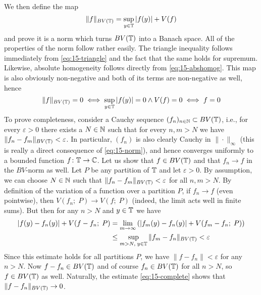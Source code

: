 \documentclass[a4paper, 12pt]{article}
\begin{document}
\begin{Exercise}
    We then define the map
    \begin{equation}
        \label{eq:15-norm}
        \|f\|_{BV(\mathbb{T})} = \sup_{y \in \mathbb{T}} |f(y)| + V(f)
    \end{equation}
    and prove it is a norm which turns $BV(\mathbb{T})$ into a Banach space.
    All of the properties of the norm follow rather easily.
    The triangle inequality follows immediately from \eqref{eq:15-triangle} and the fact that the same holds for supremum.
    Likewise, absolute homogeneity follows directly from \eqref{eq:15-abshomog}.
    This map is also obviously non-negative and both of its terms are non-negative as well,
    hence
    \[
        \|f\|_{BV(\mathbb{T})} = 0
        \iff \sup_{y \in \mathbb{T}}|f(y)| = 0 \land V(f) = 0
        \iff f = 0
    \]
    To prove completeness, consider a Cauchy sequence $(f_n)_{n \in \mathbb{N}} \subset
    BV(\mathbb{T})$, i.e., for every $\varepsilon > 0$ there exists a $N \in \mathbb{N}$ such
    that for every $n,m > N$ we have $\| f_n - f_m \|_{BV(\mathbb{T})} < \varepsilon$.
    In particular, $(f_n)$ is also clearly Cauchy in $\|\cdot\|_\infty$ (this
    is really a direct consequence of \eqref{eq:15-norm}), and hence converges
    uniformly to a bounded function $f \colon \mathbb{T} \to \mathbb{C}$.
    Let us show that $f \in BV(\mathbb{T})$ and that $f_n \to f$ in the $BV$-norm as well.
    Let $P$ be any partition of $\mathbb{T}$ and let $\varepsilon > 0$.
    By assumption, we can choose $N \in \mathbb{N}$ such that $\| f_n - f_m \|_{BV(\mathbb{T})} < \varepsilon$ for all $n, m > N$.
    By definition of the variation of a function over a partition $P$, if $f_n
    \to f$ (even pointwise), then $V(f_n;\; P) \to V(f; \; P)$ (indeed, the
    limit acts well in finite sums).  But then for any $n > N$ and $y \in \mathbb{T}$
    we have
    \begin{equation}
        \label{eq:15-complete}
        \begin{aligned}
            |f(y) - f_n(y)| + V(f - f_n; \; P)
            &= \lim_{m \to \infty}\left( |f_m(y) - f_n(y)| + V(f_m - f_n; \; P) \right) \\
            &\leq \sup_{m > N,\; y \in \mathbb{T}} \| f_m - f_n \|_{BV(\mathbb{T})}
            < \varepsilon
        \end{aligned}
    \end{equation}
    Since this estimate holds for all partitions $P$, we have $\| f - f_n \| <
    \varepsilon$ for any $n > N$. Now $f - f_n \in BV(\mathbb{T})$ and of course $f_n
    \in BV(\mathbb{T})$ for all $n > N$, so $f \in BV(\mathbb{T})$ as well.  Naturally, the
    estimate \eqref{eq:15-complete} shows that $\| f - f_n \|_{BV(\mathbb{T})} \to 0$.


\end{Exercise}
\end{document}
